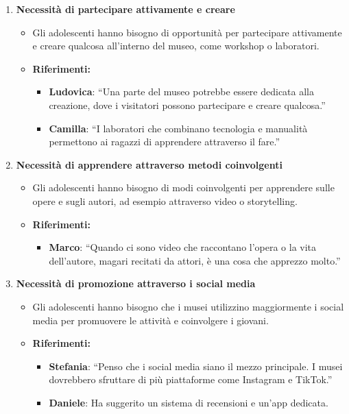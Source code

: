 \documentclass{article}
\begin{document}
\begin{enumerate}
    \item \textbf{Necessità di partecipare attivamente e creare}
    \begin{itemize}
        \item Gli adolescenti hanno bisogno di opportunità per partecipare attivamente e creare qualcosa all'interno del museo, come workshop o laboratori.
        \item \textbf{Riferimenti:}
        \begin{itemize}
            \item \textbf{Ludovica}: ``Una parte del museo potrebbe essere dedicata alla creazione, dove i visitatori possono partecipare e creare qualcosa.''
            \item \textbf{Camilla}: ``I laboratori che combinano tecnologia e manualità permettono ai ragazzi di apprendere attraverso il fare.''
        \end{itemize}
    \end{itemize}

    \item \textbf{Necessità di apprendere attraverso metodi coinvolgenti}
    \begin{itemize}
        \item Gli adolescenti hanno bisogno di modi coinvolgenti per apprendere sulle opere e sugli autori, ad esempio attraverso video o storytelling.
        \item \textbf{Riferimenti:}
        \begin{itemize}
            \item \textbf{Marco}: ``Quando ci sono video che raccontano l'opera o la vita dell'autore, magari recitati da attori, è una cosa che apprezzo molto.''
        \end{itemize}
    \end{itemize}

    \item \textbf{Necessità di promozione attraverso i social media}
    \begin{itemize}
        \item Gli adolescenti hanno bisogno che i musei utilizzino maggiormente i social media per promuovere le attività e coinvolgere i giovani.
        \item \textbf{Riferimenti:}
        \begin{itemize}
            \item \textbf{Stefania}: ``Penso che i social media siano il mezzo principale. I musei dovrebbero sfruttare di più piattaforme come Instagram e TikTok.''
            \item \textbf{Daniele}: Ha suggerito un sistema di recensioni e un'app dedicata.
        \end{itemize}
    \end{itemize}

\end{enumerate}
\end{document}
